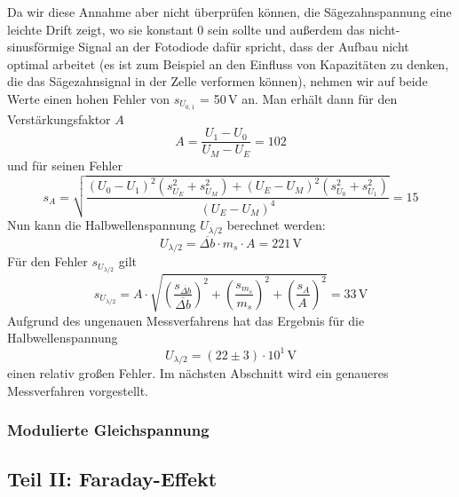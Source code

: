 Da wir diese Annahme aber nicht überprüfen können,
die Sägezahnspannung eine leichte Drift zeigt, wo sie konstant 0 sein sollte
und außerdem das nicht-sinusförmige
Signal an der Fotodiode dafür spricht, dass der Aufbau nicht optimal arbeitet
(es ist zum Beispiel an den Einfluss von Kapazitäten zu denken,
die das Sägezahnsignal in der Zelle verformen können),
nehmen wir auf beide Werte einen hohen Fehler von $s_{U_{0,1}}$ = 50\,V an.
Man erhält dann für den Verstärkungsfaktor $A$
\begin{equation}
  A=\frac{U_1-U_0}{U_M-U_E}=102
\end{equation}
und für seinen Fehler
\begin{equation}
  s_A=\sqrt{\frac{(U_0-U_1)^2 \left(s_{U_E}^2+s_{U_M}^2\right)+(U_E-U_M)^2 \left(s_{U_0}^2+s_{U_1}^2\right)}{(U_E-U_M)^4}}
  =15
\end{equation}
Nun kann die Halbwellenspannung $U_{\lambda / 2}$ berechnet werden:
\begin{equation}
  U_{\lambda / 2}  = \overline{\Delta b} \cdot m_s \cdot A = 221\,\text{V}
\end{equation}
Für den Fehler $s_{U_{\lambda / 2}}$ gilt
\begin{equation}
  s_{U_{\lambda / 2}} = A \cdot \sqrt{\left(\frac{s_{\overline{\Delta b}}}{\overline{\Delta b}}\right)^2+\left(\frac{s_{m_s}}{m_s}\right)^2+\left(\frac{s_{A}}{A_{\,}}\right)^2}
  = 33 \,\text{V}
\end{equation}
Aufgrund des ungenauen Messverfahrens hat das Ergebnis für die Halbwellenspannung
\begin{equation}
  U_{\lambda / 2}  = (22 \pm 3) \cdot 10^1\,\text{V}
\end{equation}
einen relativ großen Fehler.
Im nächsten Abschnitt wird ein genaueres Messverfahren vorgestellt.


\subsubsection{Modulierte Gleichspannung}

\subsection{Teil II: Faraday-Effekt}
